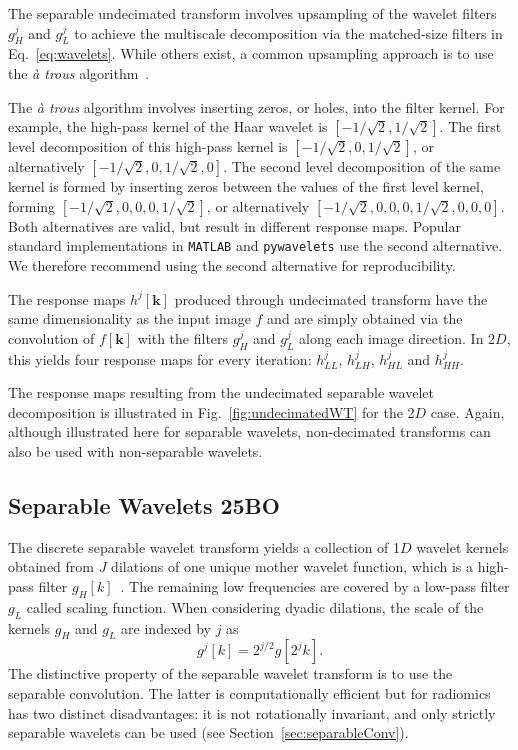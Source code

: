 \documentclass[fleqn,a4paper,oneside,openany]{book}
\newcommand\id[1]{{\hfill\normalsize{\idfont #1}}}
\renewcommand{\marginnote}[2][]{}
\begin{document}
The separable undecimated transform involves upsampling of the wavelet filters $g_H^j$ and $g_L^j$ to achieve the multiscale decomposition via the matched-size filters in Eq.~\eqref{eq:wavelets}.
While others exist, a common upsampling approach is to use the \emph{\`{a} trous} algorithm~\cite{Dut1989}.
%
\marginnote{\footnotesize v4: Clarified implementation of the \emph{\`{a} trous} algorithm.}
The \emph{\`{a} trous} algorithm involves inserting zeros, or holes, into the filter kernel. For example, the high-pass kernel of the Haar wavelet is \(\left[ -1 / \sqrt{2}, 1 / \sqrt{2}\right]\). The first level decomposition of this high-pass kernel is \(\left[ -1 / \sqrt{2}, 0, 1 / \sqrt{2}\right]\), or alternatively \(\left[ -1 / \sqrt{2}, 0, 1 / \sqrt{2}, 0\right]\). The second level decomposition of the same kernel is formed by inserting zeros between the values of the first level kernel, forming \(\left[ -1 / \sqrt{2}, 0, 0, 0, 1 / \sqrt{2}\right]\), or alternatively \(\left[ -1 / \sqrt{2}, 0, 0, 0, 1 / \sqrt{2}, 0, 0, 0\right]\). Both alternatives are valid, but result in different response maps. Popular standard implementations in \texttt{MATLAB} and \texttt{pywavelets} use the second alternative. We therefore recommend using the second alternative for reproducibility.

The response maps $h^j[\boldsymbol{k}]$ produced through undecimated transform have the same dimensionality as the input image $f$ and are simply obtained via the convolution of $f[\boldsymbol{k}]$ with the filters $g_H^j$ and $g_L^j$ along each image direction.
In 2$D$, this yields four response maps for every iteration: $h_{LL}^j$, $h_{LH}^j$, $h_{HL}^j$ and $h_{HH}^j$.

The response maps resulting from the undecimated separable wavelet decomposition is illustrated in Fig.~\ref{fig:undecimatedWT} for the 2$D$ case.
Again, although illustrated here for separable wavelets, non-decimated transforms can also be used with non-separable wavelets.
%
\subsection[Separable Wavelets]{Separable Wavelets \id{25BO}}\label{sec:separableWavelets}
%
The discrete separable wavelet transform yields a collection of 1$D$ wavelet kernels obtained from $J$ dilations of one unique mother wavelet function, which is a high-pass filter $g_H[k]$~\cite{Dau1992}.
The remaining low frequencies are covered by a low-pass filter $g_L$ called scaling function.
When considering dyadic dilations, the scale of the kernels $g_H$ and $g_L$ are indexed by $j$ as
%
\begin{equation}\label{eq:wavelets}
g^j[k] = 2^{j/2}g[2^j k].
\end{equation}
%
The distinctive property of the separable wavelet transform is to use the separable convolution. 
The latter is computationally efficient but for radiomics has two distinct disadvantages: it is not rotationally invariant, and only strictly separable wavelets can be used (see Section~\ref{sec:separableConv}). 
\end{document}

